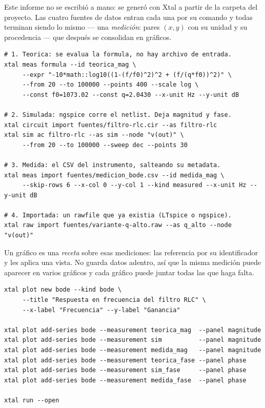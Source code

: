 Este informe no se escribió a mano: se generó con Xtal a partir de la carpeta
del proyecto. Las cuatro fuentes de datos entran cada una por su comando y todas
terminan siendo lo mismo --- una \emph{medición}: pares $(x,y)$ con su unidad y
su procedencia --- que después se consolidan en gráficos.

\begin{lstlisting}[language=consola, caption={Las cuatro maneras de conseguir una curva.}, captionpos=b]
# 1. Teorica: se evalua la formula, no hay archivo de entrada.
xtal meas formula --id teorica_mag \
     --expr "-10*math::log10((1-(f/f0)^2)^2 + (f/(q*f0))^2)" \
     --from 20 --to 100000 --points 400 --scale log \
     --const f0=1073.02 --const q=2.0430 --x-unit Hz --y-unit dB

# 2. Simulada: ngspice corre el netlist. Deja magnitud y fase.
xtal circuit import fuentes/filtro-rlc.cir --as filtro-rlc
xtal sim ac filtro-rlc --as sim --node "v(out)" \
     --from 20 --to 100000 --sweep dec --points 30

# 3. Medida: el CSV del instrumento, salteando su metadata.
xtal meas import fuentes/medicion_bode.csv --id medida_mag \
     --skip-rows 6 --x-col 0 --y-col 1 --kind measured --x-unit Hz --y-unit dB

# 4. Importada: un rawfile que ya existia (LTspice o ngspice).
xtal raw import fuentes/variante-q-alto.raw --as q_alto --node "v(out)"
\end{lstlisting}

Un gráfico es una \emph{receta} sobre esas mediciones: las referencia por su
identificador y les aplica una vista. No guarda datos adentro, así que la misma
medición puede aparecer en varios gráficos y cada gráfico puede juntar todas las
que haga falta.

\begin{lstlisting}[language=consola, caption={El Bode de la Figura~\ref{fig:bode}, completo.}, captionpos=b]
xtal plot new bode --kind bode \
     --title "Respuesta en frecuencia del filtro RLC" \
     --x-label "Frecuencia" --y-label "Ganancia"

xtal plot add-series bode --measurement teorica_mag  --panel magnitude
xtal plot add-series bode --measurement sim          --panel magnitude
xtal plot add-series bode --measurement medida_mag   --panel magnitude
xtal plot add-series bode --measurement teorica_fase --panel phase
xtal plot add-series bode --measurement sim_fase     --panel phase
xtal plot add-series bode --measurement medida_fase  --panel phase

xtal run --open
\end{lstlisting}

